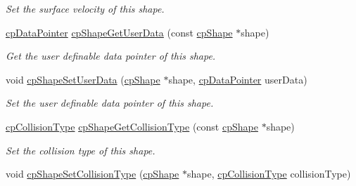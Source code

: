 \begin{DoxyCompactItemize}
\begin{DoxyCompactList}\small\item\em Set the surface velocity of this shape. \end{DoxyCompactList}\item 
\hypertarget{group__cp_shape_ga213f49ea717b8a2d5b3271b4aee168d4}{}\hyperlink{group__basic_types_ga2ac2c3c31e21893941f9e4f8ee279447}{cp\+Data\+Pointer} \hyperlink{group__cp_shape_ga213f49ea717b8a2d5b3271b4aee168d4}{cp\+Shape\+Get\+User\+Data} (const \hyperlink{structcp_shape}{cp\+Shape} $\ast$shape)\label{group__cp_shape_ga213f49ea717b8a2d5b3271b4aee168d4}

\begin{DoxyCompactList}\small\item\em Get the user definable data pointer of this shape. \end{DoxyCompactList}\item 
\hypertarget{group__cp_shape_ga98103410747b71fcd5fd6cf2ac7cff7d}{}void \hyperlink{group__cp_shape_ga98103410747b71fcd5fd6cf2ac7cff7d}{cp\+Shape\+Set\+User\+Data} (\hyperlink{structcp_shape}{cp\+Shape} $\ast$shape, \hyperlink{group__basic_types_ga2ac2c3c31e21893941f9e4f8ee279447}{cp\+Data\+Pointer} user\+Data)\label{group__cp_shape_ga98103410747b71fcd5fd6cf2ac7cff7d}

\begin{DoxyCompactList}\small\item\em Set the user definable data pointer of this shape. \end{DoxyCompactList}\item 
\hypertarget{group__cp_shape_ga7f0afa7a634bbb0f6dd2177d3fb23e66}{}\hyperlink{group__basic_types_gae83e2f50965eb441e36ffff1e32e6d02}{cp\+Collision\+Type} \hyperlink{group__cp_shape_ga7f0afa7a634bbb0f6dd2177d3fb23e66}{cp\+Shape\+Get\+Collision\+Type} (const \hyperlink{structcp_shape}{cp\+Shape} $\ast$shape)\label{group__cp_shape_ga7f0afa7a634bbb0f6dd2177d3fb23e66}

\begin{DoxyCompactList}\small\item\em Set the collision type of this shape. \end{DoxyCompactList}\item 
\hypertarget{group__cp_shape_ga45d31a1d1054fef768eafe28fdffcaf5}{}void \hyperlink{group__cp_shape_ga45d31a1d1054fef768eafe28fdffcaf5}{cp\+Shape\+Set\+Collision\+Type} (\hyperlink{structcp_shape}{cp\+Shape} $\ast$shape, \hyperlink{group__basic_types_gae83e2f50965eb441e36ffff1e32e6d02}{cp\+Collision\+Type} collision\+Type)\label{group__cp_shape_ga45d31a1d1054fef768eafe28fdffcaf5}


\end{DoxyCompactItemize}
